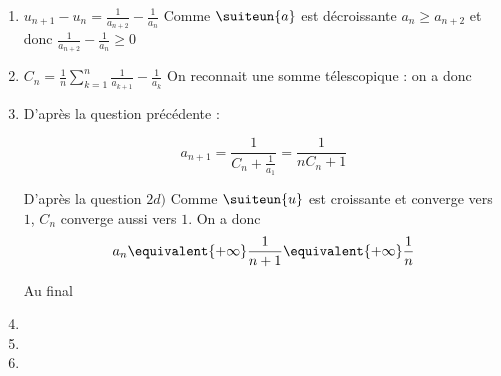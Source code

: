 \begin{correction}
\begin{enumerate}
\begin{enumerate}
\item $u_{n+1}-u_n= \frac{1}{a_{n+2}}- \frac{1}{a_n}$
Comme $\suiteun{a}$  est décroissante $a_n\geq a_{n+2}$ et donc 
$\frac{1}{a_{n+2}}- \frac{1}{a_n}\geq  0$ 


\item $C_n =\frac{1}{n }\sum_{k=1}^n \frac{1}{a_{k+1}} -\frac{1}{a_k} $
On reconnait une somme télescopique : on a donc 



\item D'après la question précédente : 

$$a_{n+1} = \frac{1}{C_n +\frac{1}{a_1}}= \frac{1}{nC_n +1}$$

D'après la question $2d)$ Comme $\suiteun{u}$ est croissante et converge  vers $1$, $C_n$ converge aussi vers $1$. 
On a donc $$a_n \equivalent{+\infty} \frac{1}{n+1}\equivalent{+\infty} \frac{1}{n}$$

Au final 



\item 
\item 
\item 
\end{enumerate}
\end{enumerate}
\end{correction}